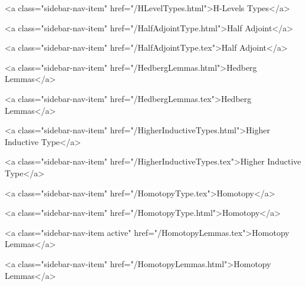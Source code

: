       
        
          <a class="sidebar-nav-item" href="/HLevelTypes.html">H-Levels Types</a>
        
      
    
      
        
          <a class="sidebar-nav-item" href="/HalfAdjointType.html">Half Adjoint</a>
        
      
    
      
        
          <a class="sidebar-nav-item" href="/HalfAdjointType.tex">Half Adjoint</a>
        
      
    
      
        
          <a class="sidebar-nav-item" href="/HedbergLemmas.html">Hedberg Lemmas</a>
        
      
    
      
        
          <a class="sidebar-nav-item" href="/HedbergLemmas.tex">Hedberg Lemmas</a>
        
      
    
      
        
          <a class="sidebar-nav-item" href="/HigherInductiveTypes.html">Higher Inductive Type</a>
        
      
    
      
        
          <a class="sidebar-nav-item" href="/HigherInductiveTypes.tex">Higher Inductive Type</a>
        
      
    
      
        
          <a class="sidebar-nav-item" href="/HomotopyType.tex">Homotopy</a>
        
      
    
      
        
          <a class="sidebar-nav-item" href="/HomotopyType.html">Homotopy</a>
        
      
    
      
        
          <a class="sidebar-nav-item active" href="/HomotopyLemmas.tex">Homotopy Lemmas</a>
        
      
    
      
        
          <a class="sidebar-nav-item" href="/HomotopyLemmas.html">Homotopy Lemmas</a>
        
